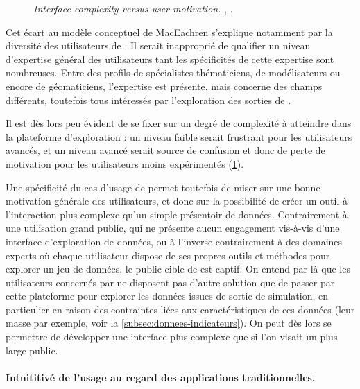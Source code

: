 \begin{figure}[H]
\begin{minipage}[t]{.46\linewidth}
		\caption[\og \textit{Interface complexity versus user motivation. }\fg{}.]{\og \textit{Interface complexity versus user motivation. }\fg{}, \textcite[79]{roth_interactive_2013}.}
		\label{fig:interface-complexity}
	\end{minipage}
	\medskip
\end{figure}

Cet écart au modèle conceptuel de MacEachren s'explique notamment par la diversité des utilisateurs de \simedb{}.
Il serait inapproprié de qualifier un niveau d'expertise général des utilisateurs tant les spécificités de cette expertise sont nombreuses.
Entre des profils de spécialistes thématiciens, de modélisateurs ou encore de géomaticiens, l'expertise est présente, mais concerne des champs différents, toutefois tous intéressés par l'exploration des sorties de \simfeodal{}.

Il est dès lors peu évident de se fixer sur un degré de complexité à atteindre dans la plateforme d'exploration : un niveau faible serait frustrant pour les utilisateurs avancés, et un niveau avancé serait source de confusion et donc de perte de motivation pour les utilisateurs moins expérimentés (\cref{fig:interface-complexity}).

Une spécificité du cas d'usage de \simedb{} permet toutefois de miser sur une bonne motivation générale des utilisateurs, et donc sur la possibilité de créer un outil à l'interaction plus complexe qu'un simple présentoir de données.
Contrairement à une utilisation grand public, qui ne présente aucun engagement vis-à-vis d'une interface d'exploration de données, ou à l'inverse contrairement à des domaines experts où chaque utilisateur dispose de ses propres outils et méthodes pour explorer un jeu de données, le public cible de \simedb{} est \og captif\fg{}.
On entend par là que les utilisateurs concernés par \simedb{} ne disposent pas d'autre solution que de passer par cette plateforme pour explorer les données issues de sortie de simulation, en particulier en raison des contraintes liées aux caractéristiques de ces données (leur masse par exemple, voir la \cref{subsec:donnees-indicateurs}).
On peut dès lors se permettre de développer une interface plus complexe que si l'on visait un plus large public.

\paragraph{Intuititivé de l'usage au regard des applications traditionnelles.}

